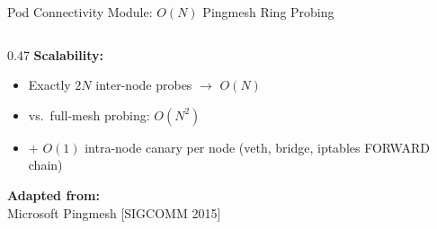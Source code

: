 \documentclass[aspectratio=169, 11pt]{beamer}
\begin{document}
\begin{frame}{Pod Connectivity Module: $O(N)$ Pingmesh Ring Probing}
\begin{columns}[T]
\begin{column}{0.47\textwidth}
\vspace{4pt}
\textbf{Scalability:}
\begin{itemize}
  \item Exactly $2N$ inter-node probes $\to$ $O(N)$
  \item vs.\ full-mesh probing: $O(N^2)$
  \item $+$ $O(1)$ intra-node canary per node (veth, bridge, iptables FORWARD chain)
\end{itemize}

\vspace{4pt}
\textbf{Adapted from:}\\
Microsoft Pingmesh [SIGCOMM 2015]
\end{column}
\end{columns}

\end{frame}
\end{document}
